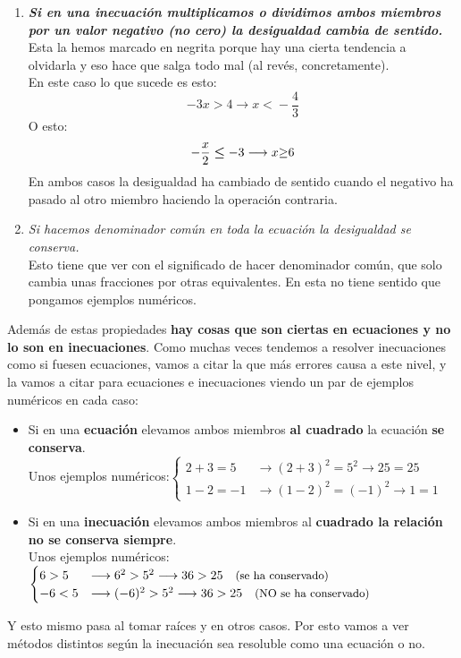 \documentclass[a4paper,11pt,answers]{exam}
\begin{document}
\begin{enumerate}
  \item \textbf{\emph{Si en una inecuación multiplicamos o dividimos ambos miembros por un valor
        negativo (no cero) la desigualdad cambia de sentido.}}\\
    Esta la hemos marcado en negrita porque hay una cierta tendencia a olvidarla y eso hace que salga todo
    mal (al revés, concretamente).\\
    En este caso lo que sucede es esto:
    \[-3x \boldsymbol{>} 4 \longrightarrow x \boldsymbol{<} -\frac{4}{3}\]
    O esto:
    \[-\frac{x}{2} \boldsymbol{\leq} -3 \longrightarrow x \bold{\geq} 6\]
    En ambos casos la desigualdad ha cambiado de sentido cuando el negativo ha pasado al
    otro miembro haciendo la operación contraria.
  \item \emph{Si hacemos denominador común en toda la ecuación la desigualdad se conserva.}\\
    Esto tiene que ver con el significado de hacer denominador común, que solo cambia unas fracciones por otras
    equivalentes. En esta no tiene sentido que pongamos ejemplos numéricos.
  \end{enumerate}
  
  Además de estas propiedades \textbf{hay cosas que son ciertas en ecuaciones y no lo son en inecuaciones}.
  Como muchas veces tendemos a resolver inecuaciones como si fuesen ecuaciones, vamos a citar la que más errores
  causa a este nivel, y la vamos a citar para ecuaciones e inecuaciones viendo un par de ejemplos numéricos en cada
  caso:
  \begin{itemize}
  \item Si en una \textbf{ecuación} elevamos ambos miembros \textbf{al cuadrado} la ecuación \textbf{se conserva}.\\

    Unos ejemplos numéricos:$
    \begin{cases}
      2+3=5&\longrightarrow (2+3)^2 = 5^2 \longrightarrow 25 = 25\\
      1-2 = -1&\longrightarrow (1-2)^2 = (-1)^2 \longrightarrow 1 = 1
    \end{cases}$
  \item Si en una \textbf{inecuación} elevamos ambos miembros al \textbf{cuadrado la relación no se conserva siempre}.\\
    
    Unos ejemplos numéricos:$
    \begin{cases}
      6 > 5&\longrightarrow 6^2 > 5^2 \longrightarrow 36 > 25\quad \text{\small{(se ha conservado)}}\\
      -6 < 5&\longrightarrow (-6)^2 > 5^2 \longrightarrow 36 > 25\quad \text{\small{(NO se ha conservado)}}
    \end{cases}$
  \end{itemize}
  Y esto mismo pasa al tomar raíces y en otros casos. Por esto vamos a ver métodos distintos según la inecuación
  sea resoluble como una ecuación o no.
\end{document}

